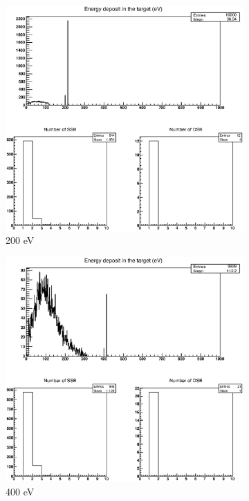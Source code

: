 \begin{figure}
\centering
\begin{subfigure}{.5\textwidth}
  \centering
  \includegraphics[width=.78\linewidth]{./Figures/proton200eV.eps}
  \caption{200 eV}
  \label{fig:sub1}
\end{subfigure}%
\begin{subfigure}{.5\textwidth}
  \centering
  \includegraphics[width=.78\linewidth]{./Figures/proton400eV.eps}
  \caption{400 eV}
  \label{fig:sub2}
\end{subfigure}
\begin{subfigure}{.5\textwidth}
  \centering

\end{subfigure}
\end{figure}
